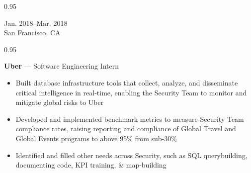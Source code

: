 \documentclass[a4paper,9pt]{article}
\newcommand{\mainMarginBottom}{\vspace*{1.5pt}}
\newcommand{\newLine}{\\}
\newcommand{\doubleColumnGap}{\hspace{4mm}}
\newcommand{\withinSectionMarginBetween}{\vspace{-3ex}}
\newcommand{\mainLineSpacing}{0.95}
\begin{document}
\withinSectionMarginBetween{}

\begin{minipage}[t]{0.20\linewidth}
  \begin{small}
    \begin{spacing}\mainLineSpacing{}
      \begin{flushright}
        Jan. 2018--Mar. 2018
        \newLine{}
        \mainMarginBottom{}
        San Francisco, CA
      \end{flushright}
    \end{spacing}
  \end{small}
\end{minipage}
\doubleColumnGap{}
\begin{minipage}[t]{0.75\linewidth}
  \begin{small}
    \begin{spacing}\mainLineSpacing{}
      \begin{flushleft}
        \textbf{Uber} --- Software Engineering Intern
        \mainMarginBottom{}
        \begin{itemize}[itemsep=0pt,topsep=0pt,leftmargin=*]
          \item Built database infrastructure tools that collect, analyze, and disseminate critical intelligence in real-time, enabling the Security Team to monitor and mitigate global risks to Uber
          \item Developed and implemented benchmark metrics to measure Security Team compliance rates, raising reporting and compliance of Global Travel and Global Events programs to above 95\% from sub-30\%
          \item Identified and filled other needs across Security, such as SQL querybuilding, documenting code, KPI training, \& map-building
        \end{itemize}
      \end{flushleft}
    \end{spacing}
  \end{small}
\end{minipage}

\withinSectionMarginBetween{}
\end{document}

